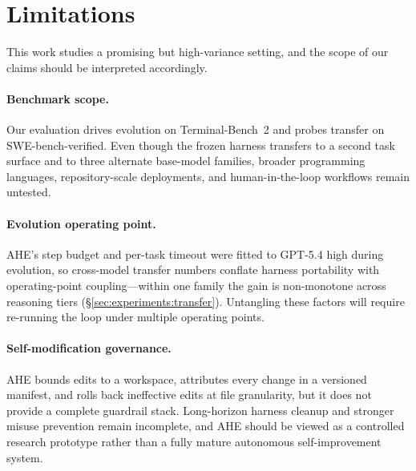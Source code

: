 \section*{Limitations}
\label{sec:limitations}

This work studies a promising but high-variance setting, and the scope of our claims should be interpreted accordingly.


\paragraph{Benchmark scope.}
Our evaluation drives evolution on Terminal-Bench~2 and probes transfer on SWE-bench-verified. Even though the frozen harness transfers to a second task surface and to three alternate base-model families, broader programming languages, repository-scale deployments, and human-in-the-loop workflows remain untested.

\paragraph{Evolution operating point.}
AHE's step budget and per-task timeout were fitted to GPT-5.4 high during evolution, so cross-model transfer numbers conflate harness portability with operating-point coupling—within one family the gain is non-monotone across reasoning tiers (\S\ref{sec:experiments:transfer}). Untangling these factors will require re-running the loop under multiple operating points.


\paragraph{Self-modification governance.}
AHE bounds edits to a workspace, attributes every change in a versioned manifest, and rolls back ineffective edits at file granularity, but it does not provide a complete guardrail stack. Long-horizon harness cleanup and stronger misuse prevention remain incomplete, and AHE should be viewed as a controlled research prototype rather than a fully mature autonomous self-improvement system.